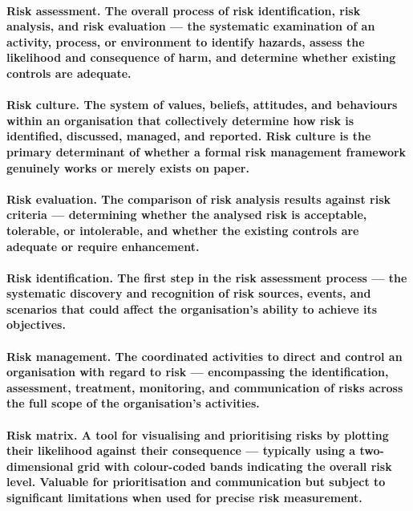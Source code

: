 \paragraph{\textbf{Risk assessment}. The overall process of risk identification, risk analysis, and risk evaluation — the systematic examination of an activity, process, or environment to identify hazards, assess the likelihood and consequence of harm, and determine whether existing controls are adequate.}

\paragraph{\textbf{Risk culture}. The system of values, beliefs, attitudes, and behaviours within an organisation that collectively determine how risk is identified, discussed, managed, and reported. Risk culture is the primary determinant of whether a formal risk management framework genuinely works or merely exists on paper.}

\paragraph{\textbf{Risk evaluation}. The comparison of risk analysis results against risk criteria — determining whether the analysed risk is acceptable, tolerable, or intolerable, and whether the existing controls are adequate or require enhancement.}

\paragraph{\textbf{Risk identification}. The first step in the risk assessment process — the systematic discovery and recognition of risk sources, events, and scenarios that could affect the organisation's ability to achieve its objectives.}

\paragraph{\textbf{Risk management}. The coordinated activities to direct and control an organisation with regard to risk — encompassing the identification, assessment, treatment, monitoring, and communication of risks across the full scope of the organisation's activities.}

\paragraph{\textbf{Risk matrix}. A tool for visualising and prioritising risks by plotting their likelihood against their consequence — typically using a two-dimensional grid with colour-coded bands indicating the overall risk level. Valuable for prioritisation and communication but subject to significant limitations when used for precise risk measurement.}

